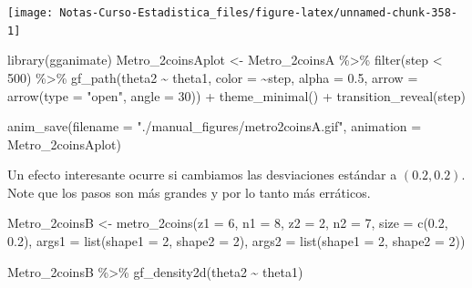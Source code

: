 \documentclass[
  12pt,
]{book}
\newenvironment{Shaded}{\begin{snugshade}}{\end{snugshade}}
\newcommand{\AttributeTok}[1]{\textcolor[rgb]{0.77,0.63,0.00}{#1}}
\newcommand{\DecValTok}[1]{\textcolor[rgb]{0.00,0.00,0.81}{#1}}
\newcommand{\FloatTok}[1]{\textcolor[rgb]{0.00,0.00,0.81}{#1}}
\newcommand{\FunctionTok}[1]{\textcolor[rgb]{0.00,0.00,0.00}{#1}}
\newcommand{\NormalTok}[1]{#1}
\newcommand{\OtherTok}[1]{\textcolor[rgb]{0.56,0.35,0.01}{#1}}
\newcommand{\SpecialCharTok}[1]{\textcolor[rgb]{0.00,0.00,0.00}{#1}}
\newcommand{\StringTok}[1]{\textcolor[rgb]{0.31,0.60,0.02}{#1}}
\theoremstyle{definition}
\theoremstyle{definition}
\theoremstyle{definition}
\theoremstyle{definition}
\theoremstyle{remark}
\begin{document}
\begin{center}\texttt{[image: Notas-Curso-Estadistica\_files/figure-latex/unnamed-chunk-358-1]} \end{center}

\begin{Shaded}
\begin{Highlighting}[]
\FunctionTok{library}\NormalTok{(gganimate)}
\NormalTok{Metro\_2coinsAplot }\OtherTok{\textless{}{-}}\NormalTok{ Metro\_2coinsA }\SpecialCharTok{\%\textgreater{}\%}
    \FunctionTok{filter}\NormalTok{(step }\SpecialCharTok{\textless{}} \DecValTok{500}\NormalTok{) }\SpecialCharTok{\%\textgreater{}\%}
    \FunctionTok{gf\_path}\NormalTok{(theta2 }\SpecialCharTok{\textasciitilde{}}\NormalTok{ theta1, }\AttributeTok{color =} \SpecialCharTok{\textasciitilde{}}\NormalTok{step, }\AttributeTok{alpha =} \FloatTok{0.5}\NormalTok{,}
        \AttributeTok{arrow =} \FunctionTok{arrow}\NormalTok{(}\AttributeTok{type =} \StringTok{"open"}\NormalTok{, }\AttributeTok{angle =} \DecValTok{30}\NormalTok{)) }\SpecialCharTok{+}
    \FunctionTok{theme\_minimal}\NormalTok{() }\SpecialCharTok{+} \FunctionTok{transition\_reveal}\NormalTok{(step)}

\FunctionTok{anim\_save}\NormalTok{(}\AttributeTok{filename =} \StringTok{"./manual\_figures/metro2coinsA.gif"}\NormalTok{,}
    \AttributeTok{animation =}\NormalTok{ Metro\_2coinsAplot)}
\end{Highlighting}
\end{Shaded}

Un efecto interesante ocurre si cambiamos las desviaciones estándar a \((0.2,0.2)\). Note que los pasos son más grandes y por lo tanto más erráticos.

\begin{Shaded}
\begin{Highlighting}[]
\NormalTok{Metro\_2coinsB }\OtherTok{\textless{}{-}} \FunctionTok{metro\_2coins}\NormalTok{(}\AttributeTok{z1 =} \DecValTok{6}\NormalTok{, }\AttributeTok{n1 =} \DecValTok{8}\NormalTok{, }\AttributeTok{z2 =} \DecValTok{2}\NormalTok{,}
    \AttributeTok{n2 =} \DecValTok{7}\NormalTok{, }\AttributeTok{size =} \FunctionTok{c}\NormalTok{(}\FloatTok{0.2}\NormalTok{, }\FloatTok{0.2}\NormalTok{), }\AttributeTok{args1 =} \FunctionTok{list}\NormalTok{(}\AttributeTok{shape1 =} \DecValTok{2}\NormalTok{,}
        \AttributeTok{shape2 =} \DecValTok{2}\NormalTok{), }\AttributeTok{args2 =} \FunctionTok{list}\NormalTok{(}\AttributeTok{shape1 =} \DecValTok{2}\NormalTok{, }\AttributeTok{shape2 =} \DecValTok{2}\NormalTok{))}

\NormalTok{Metro\_2coinsB }\SpecialCharTok{\%\textgreater{}\%}
    \FunctionTok{gf\_density2d}\NormalTok{(theta2 }\SpecialCharTok{\textasciitilde{}}\NormalTok{ theta1)}
\end{Highlighting}
\end{Shaded}
\end{document}
